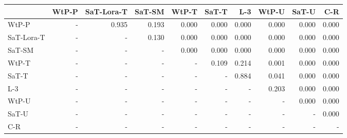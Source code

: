 \begin{tabular}{lrrrrrrrrr}
\toprule
 & WtP-P & SaT-Lora-T & SaT-SM & WtP-T & SaT-T & L-3 & WtP-U & SaT-U & C-R \\
\midrule
WtP-P & - & 0.935 & 0.193 & 0.000 & 0.000 & 0.000 & 0.000 & 0.000 & 0.000 \\
SaT-Lora-T & - & - & 0.130 & 0.000 & 0.000 & 0.000 & 0.000 & 0.000 & 0.000 \\
SaT-SM & - & - & - & 0.000 & 0.000 & 0.000 & 0.000 & 0.000 & 0.000 \\
WtP-T & - & - & - & - & 0.109 & 0.214 & 0.001 & 0.000 & 0.000 \\
SaT-T & - & - & - & - & - & 0.884 & 0.041 & 0.000 & 0.000 \\
L-3 & - & - & - & - & - & - & 0.203 & 0.000 & 0.000 \\
WtP-U & - & - & - & - & - & - & - & 0.000 & 0.000 \\
SaT-U & - & - & - & - & - & - & - & - & 0.000 \\
C-R & - & - & - & - & - & - & - & - & - \\
\bottomrule
\end{tabular}

